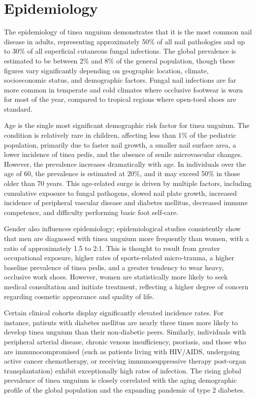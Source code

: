 \section*{Epidemiology}
The epidemiology of tinea unguium demonstrates that it is the most common nail disease in adults, representing approximately 50\% of all nail pathologies and up to 30\% of all superficial cutaneous fungal infections. The global prevalence is estimated to be between 2\% and 8\% of the general population, though these figures vary significantly depending on geographic location, climate, socioeconomic status, and demographic factors. Fungal nail infections are far more common in temperate and cold climates where occlusive footwear is worn for most of the year, compared to tropical regions where open-toed shoes are standard.

Age is the single most significant demographic risk factor for tinea unguium. The condition is relatively rare in children, affecting less than 1\% of the pediatric population, primarily due to faster nail growth, a smaller nail surface area, a lower incidence of tinea pedis, and the absence of senile microvascular changes. However, the prevalence increases dramatically with age. In individuals over the age of 60, the prevalence is estimated at 20\%, and it may exceed 50\% in those older than 70 years. This age-related surge is driven by multiple factors, including cumulative exposure to fungal pathogens, slowed nail plate growth, increased incidence of peripheral vascular disease and diabetes mellitus, decreased immune competence, and difficulty performing basic foot self-care.

Gender also influences epidemiology; epidemiological studies consistently show that men are diagnosed with tinea unguium more frequently than women, with a ratio of approximately 1.5 to 2:1. This is thought to result from greater occupational exposure, higher rates of sports-related micro-trauma, a higher baseline prevalence of tinea pedis, and a greater tendency to wear heavy, occlusive work shoes. However, women are statistically more likely to seek medical consultation and initiate treatment, reflecting a higher degree of concern regarding cosmetic appearance and quality of life.

Certain clinical cohorts display significantly elevated incidence rates. For instance, patients with diabetes mellitus are nearly three times more likely to develop tinea unguium than their non-diabetic peers. Similarly, individuals with peripheral arterial disease, chronic venous insufficiency, psoriasis, and those who are immunocompromised (such as patients living with HIV/AIDS, undergoing active cancer chemotherapy, or receiving immunosuppressive therapy post-organ transplantation) exhibit exceptionally high rates of infection. The rising global prevalence of tinea unguium is closely correlated with the aging demographic profile of the global population and the expanding pandemic of type 2 diabetes.

